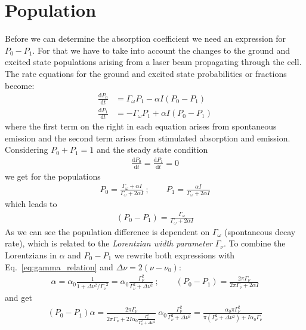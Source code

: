 \section{Population}   %
Before we can determine the absorption coefficient we need an expression for \(P_0-P_1 \).
For that we have to take into account the changes to the ground and excited state populations arising
from a laser beam propagating through the cell. The rate equations for the ground and excited state
probabilities or fractions become:
\begin{align}
    \frac{\mathrm{d}P_0}{\mathrm{d}t} &= \Gamma_\omega P_1 - \alpha I (P_0-P_1) \nonumber \\
    \frac{\mathrm{d}P_1}{\mathrm{d}t} &= -\Gamma_\omega P_1 + \alpha I (P_0-P_1)
\end{align} 
where the first term on the right in each equation arises from spontaneous emission and the second term
arises from stimulated absorption and emission.\\
Considering \(P_0+P_1=1 \) and the steady state condition
\begin{align}
    \frac{\mathrm{d}P_0}{\mathrm{d}t} = \frac{\mathrm{d}P_1}{\mathrm{d}t} = 0
\end{align}
we get for the populations
\begin{align}
        P_0 = \frac{\Gamma_\omega + \alpha I}{\Gamma_\omega + 2 \alpha I}~; \qquad
        P_1 = \frac{\alpha I}{\Gamma_\omega + 2 \alpha I}
\end{align}
which leads to
\begin{align}
    (P_0-P_1) = \frac{\Gamma_\omega}{\Gamma_\omega + 2 \alpha I} 
\end{align}
As we can see the population difference is dependent on \(\Gamma_\omega \) (spontaneous decay rate),
which is related to the \textit{Lorentzian width parameter} \(\Gamma_\nu \).
To combine the Lorentzians in \(\alpha \) and \(P_0-P_1 \) we rewrite both expressions with 
Eq.~\ref{eq:gamma_relation} and \(\Delta\nu = 2(\nu-\nu_0) \):
\begin{align}
    \alpha = \alpha_0\frac{1}{ 1+ \Delta\nu^2 / {\Gamma_\nu}^2 } 
                           = \alpha_0\frac{\Gamma_\nu^2}{\Gamma_\nu^2 + \Delta\nu^2}~; \qquad
    (P_0-P_1) = \frac{2\pi\Gamma_\nu}{2\pi\Gamma_\nu + 2 \alpha I}
\end{align}
and get
\begin{align}
    (P_0-P_1)\alpha = \frac{2\pi\Gamma_\nu}{2\pi\Gamma_\nu + 2I \alpha_0\frac{\Gamma_\nu^2}{\Gamma_\nu^2 + \Delta\nu^2}}~ 
    \alpha_0\frac{\Gamma_\nu^2}{\Gamma_\nu^2 + \Delta\nu^2} = \frac{\alpha_0\pi\Gamma_\nu^2}{\pi(\Gamma_\nu^2 + \Delta\nu^2)+I\alpha_0\Gamma_\nu}
\end{align}
